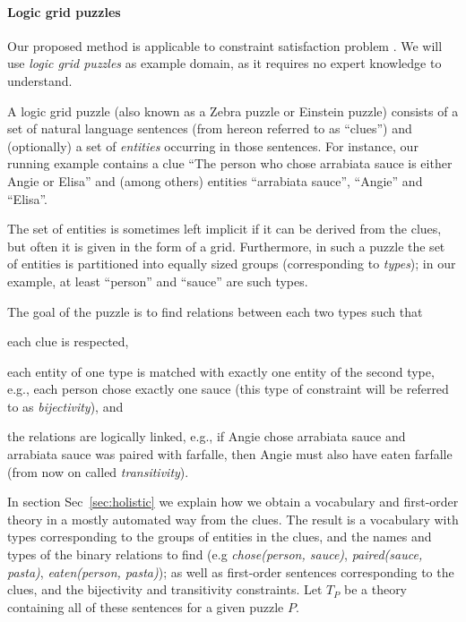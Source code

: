 
\paragraph{Logic grid puzzles}
Our proposed method is applicable to constraint satisfaction problem . We will use \textit{logic grid puzzles} as example domain, as it requires no expert knowledge to understand.

A logic grid puzzle (also known as a Zebra puzzle or Einstein puzzle) consists of a set of natural language sentences (from hereon referred to as ``clues'') and (optionally) a set of \emph{entities} occurring in those sentences. 
For instance, our running example contains a clue ``The person who chose arrabiata sauce is either Angie or Elisa'' and (among others) entities ``arrabiata sauce'', ``Angie'' and ``Elisa''. 

The set of entities is sometimes left implicit if it can be derived from the clues, but often it is given in the form of a grid. Furthermore, in such a puzzle the set of entities is partitioned into equally sized groups (corresponding to \emph{types}); in our example, at least ``person'' and ``sauce'' are such types. 

The goal of the puzzle is to find relations between each two types such that
\begin{compactitem}
	\item each clue is respected, 
	\item each entity of one type is matched with exactly one entity of the second type, e.g., each person chose exactly one sauce (this type of constraint will be referred to as \emph{bijectivity}), and 
	\item the relations are logically linked, e.g., if Angie chose arrabiata sauce and arrabiata sauce was paired with farfalle, then Angie must also have eaten farfalle (from now on called \emph{transitivity}). 
\end{compactitem}
In section Sec~\ref{sec:holistic} we explain how we obtain a vocabulary and first-order theory in a mostly automated way from the clues. The result is a vocabulary with types corresponding to the groups of entities in the clues, and the names and types of the binary relations to find (e.g \textit{chose(person, sauce)}, \textit{paired(sauce, pasta)}, \textit{eaten(person, pasta)});
as well as first-order sentences corresponding to the clues, and the bijectivity and transitivity constraints. Let $T_P$ be a theory containing all of these sentences for a given puzzle $P$.

